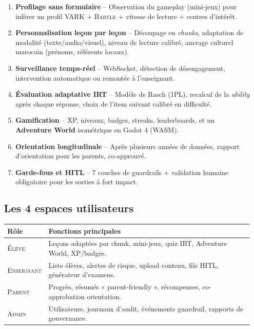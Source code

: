 \documentclass[11pt,a4paper]{article}
\begin{document}
\begin{enumerate}[label=\textbf{\textcolor{primary}{\arabic*.}},leftmargin=1.4em]
\item \textbf{Profilage sans formulaire} -- Observation du gameplay (mini-jeux) pour
inférer un profil \textsc{VARK} + \textsc{Bartle} + vitesse de lecture + centres d'intérêt.
\item \textbf{Personnalisation leçon par leçon} -- Découpage en \emph{chunks}, adaptation
de modalité (texte/audio/visuel), niveau de lecture calibré, ancrage culturel marocain
(prénoms, référents locaux).
\item \textbf{Surveillance temps-réel} -- WebSocket, détection de désengagement,
intervention automatique ou remontée à l'enseignant.
\item \textbf{Évaluation adaptative IRT} -- Modèle de Rasch (1PL), recalcul de la
\emph{ability} après chaque réponse, choix de l'item suivant calibré en difficulté.
\item \textbf{Gamification} -- XP, niveaux, badges, streaks, leaderboards, et un
\textbf{Adventure World} isométrique en Godot 4 (WASM).
\item \textbf{Orientation longitudinale} -- Après plusieurs années de données, rapport
d'orientation pour les parents, co-approuvé.
\item \textbf{Garde-fous et HITL} -- 7 couches de guardrails + validation humaine
obligatoire pour les sorties à fort impact.
\end{enumerate}

\subsection{Les 4 espaces utilisateurs}

\begin{center}
\small
\begin{tabular}{@{}p{2.6cm}p{12.4cm}@{}}
\toprule
\textbf{Rôle} & \textbf{Fonctions principales} \\
\midrule
\textsc{Élève}     & Leçons adaptées par chunk, mini-jeux, quiz IRT, Adventure World, XP/badges.\\
\textsc{Enseignant}& Liste élèves, alertes de risque, upload contenu, file HITL, générateur d'examens.\\
\textsc{Parent}    & Progrès, résumés « parent-friendly », récompenses, co-approbation orientation.\\
\textsc{Admin}     & Utilisateurs, journaux d'audit, événements guardrail, rapports de gouvernance.\\
\bottomrule
\end{tabular}
\end{center}
\end{document}
